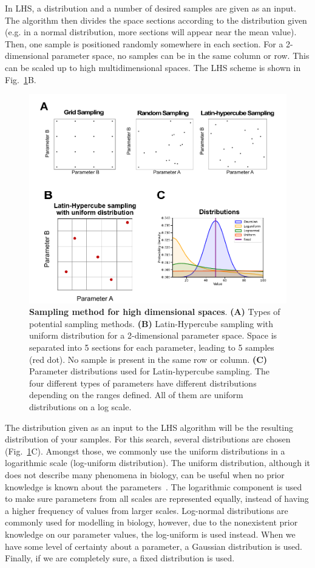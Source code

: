 In LHS, a distribution and a number of desired samples are given as an input.
The algorithm then divides the space sections according to the distribution given (e.g. in a normal distribution, more sections will appear near the mean value).
Then, one sample is positioned randomly somewhere in each section.
For a 2-dimensional parameter space, no samples can be in the same column or row.
This can be scaled up to high multidimensional spaces.
The LHS scheme is shown in Fig.~\ref{fig:distributions}B.
\begin{figure}[H]

    \includegraphics[width=1\textwidth]{chapters/Methods/distributions}
    \caption{\textbf{Sampling method for high dimensional spaces}. \textbf{(A)} Types of potential sampling methods. \textbf{(B)} Latin-Hypercube sampling with uniform distribution for a 2-dimensional parameter space. Space is separated into 5 sections for each parameter, leading to 5 samples (red dot). No sample is present in the same row or column. \textbf{(C)} Parameter distributions used for Latin-hypercube sampling. The four different types of parameters have different distributions depending on the ranges defined. All of them are uniform distributions on a log scale.}
    \label{fig:distributions}
\end{figure}
The distribution given as an input to the LHS algorithm will be the resulting distribution of your samples.
For this search, several distributions are chosen (Fig.~\ref{fig:distributions}C).
Amongst those, we commonly use the uniform distributions in a logarithmic scale (log-uniform distribution).
The uniform distribution, although it does not describe many phenomena in biology, can be useful when no prior knowledge is known about the parameters~\parencite{Frank2009}.
The logarithmic component is used to make sure parameters from all scales are represented equally, instead of having a higher frequency of values from larger scales.
Log-normal distributions are commonly used for modelling in biology, however, due to the nonexistent prior knowledge on our parameter values, the log-uniform is used instead.
When we have some level of certainty about a parameter, a Gaussian distribution is used.
Finally, if we are completely sure, a fixed distribution is used.

